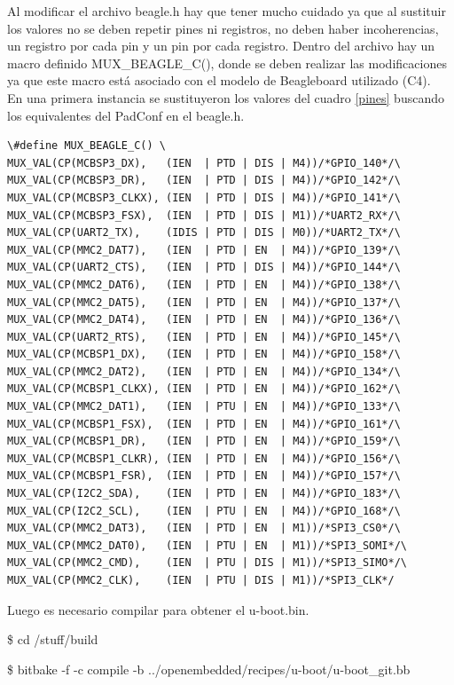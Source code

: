 Al modificar el archivo beagle.h hay que tener mucho cuidado ya que al sustituir los valores no se deben repetir pines ni registros, no deben haber incoherencias, un registro por cada pin y un pin por cada registro. 
Dentro del archivo hay un macro definido MUX\_BEAGLE\_C(), donde se deben realizar las modificaciones ya que este macro está asociado con el modelo de Beagleboard utilizado (C4).\\
En una primera instancia se sustituyeron los valores del cuadro \ref{pines} buscando los equivalentes del 
PadConf en el beagle.h. 


\begin{verbatim}
\#define MUX_BEAGLE_C() \
MUX_VAL(CP(MCBSP3_DX),   (IEN  | PTD | DIS | M4))/*GPIO_140*/\
MUX_VAL(CP(MCBSP3_DR),   (IEN  | PTD | DIS | M4))/*GPIO_142*/\
MUX_VAL(CP(MCBSP3_CLKX), (IEN  | PTD | DIS | M4))/*GPIO_141*/\
MUX_VAL(CP(MCBSP3_FSX),  (IEN  | PTD | DIS | M1))/*UART2_RX*/\
MUX_VAL(CP(UART2_TX),    (IDIS | PTD | DIS | M0))/*UART2_TX*/\
MUX_VAL(CP(MMC2_DAT7),   (IEN  | PTD | EN  | M4))/*GPIO_139*/\
MUX_VAL(CP(UART2_CTS),   (IEN  | PTD | DIS | M4))/*GPIO_144*/\
MUX_VAL(CP(MMC2_DAT6),   (IEN  | PTD | EN  | M4))/*GPIO_138*/\
MUX_VAL(CP(MMC2_DAT5),   (IEN  | PTD | EN  | M4))/*GPIO_137*/\
MUX_VAL(CP(MMC2_DAT4),   (IEN  | PTD | EN  | M4))/*GPIO_136*/\
MUX_VAL(CP(UART2_RTS),   (IEN  | PTD | EN  | M4))/*GPIO_145*/\
MUX_VAL(CP(MCBSP1_DX),   (IEN  | PTD | EN  | M4))/*GPIO_158*/\
MUX_VAL(CP(MMC2_DAT2),   (IEN  | PTD | EN  | M4))/*GPIO_134*/\
MUX_VAL(CP(MCBSP1_CLKX), (IEN  | PTD | EN  | M4))/*GPIO_162*/\
MUX_VAL(CP(MMC2_DAT1),   (IEN  | PTU | EN  | M4))/*GPIO_133*/\
MUX_VAL(CP(MCBSP1_FSX),  (IEN  | PTD | EN  | M4))/*GPIO_161*/\
MUX_VAL(CP(MCBSP1_DR),   (IEN  | PTD | EN  | M4))/*GPIO_159*/\
MUX_VAL(CP(MCBSP1_CLKR), (IEN  | PTD | EN  | M4))/*GPIO_156*/\
MUX_VAL(CP(MCBSP1_FSR),  (IEN  | PTD | EN  | M4))/*GPIO_157*/\
MUX_VAL(CP(I2C2_SDA),    (IEN  | PTD | EN  | M4))/*GPIO_183*/\
MUX_VAL(CP(I2C2_SCL),    (IEN  | PTU | EN  | M4))/*GPIO_168*/\
MUX_VAL(CP(MMC2_DAT3),   (IEN  | PTD | EN  | M1))/*SPI3_CS0*/\
MUX_VAL(CP(MMC2_DAT0),   (IEN  | PTU | EN  | M1))/*SPI3_SOMI*/\
MUX_VAL(CP(MMC2_CMD),    (IEN  | PTU | DIS | M1))/*SPI3_SIMO*/\
MUX_VAL(CP(MMC2_CLK),    (IEN  | PTU | DIS | M1))/*SPI3_CLK*/
\end{verbatim}

Luego es necesario compilar para obtener el u-boot.bin.

\bigskip
\centerline{\$ cd /stuff/build}

\centerline{\$ bitbake -f -c compile -b ../openembedded/recipes/u-boot/u-boot\_git.bb}

